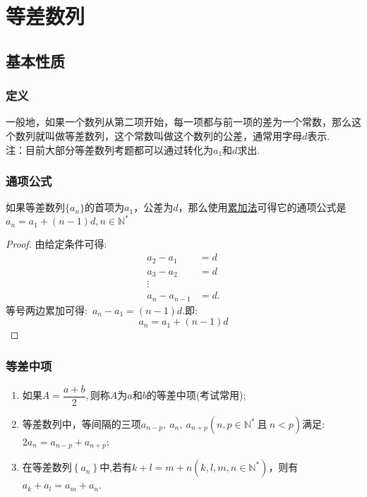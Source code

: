 \documentclass{BHCexam}
\begin{document}
\section{等差数列}
\subsection{基本性质} 
\subsubsection{定义}
一般地，如果一个数列从第二项开始，每一项都与前一项的差为一个常数，那么这个数列就叫做等差数列，这个常数叫做这个数列的公差，通常用字母$ d $表示.\\
{\kaishu 注：目前大部分等差数列考题都可以通过转化为$ a_1 $和$ d $求出.}
\subsubsection{通项公式}
如果等差数列$\{a_n\}$的首项为$ a_1 $，公差为$ d $，那么使用\underline{累加法}可得它的通项公式是$ a_n=a_1+(n-1)d ,n\in\mathbb{N^*}$
\begin{proof}
由给定条件可得:\begin{equation*}
\begin{aligned}
 a_2-a_1& =d\\
a_3-a_2&=d\\
\vdots&\\
a_n-a_{n-1}&=d.
\end{aligned}
\end{equation*}
等号两边累加可得:~$ a_n-a_1=(n-1)d .$即:~$$a_n=a_1+(n-1)d$$
\end{proof}
\subsubsection{等差中项}
\begin{enumerate}[1)]
\item 如果$ A=\dfrac{a+b}{2} ,$则称$ A $为$ a $和$ b $的等差中项(考试常用);
\item 等差数列中，等间隔的三项$a_{n-p},~a_n,~a_{n+p} (n,p\in\mathbb{N^*}~\text{且}~n<p) $满足:$ 2a_n=a_{n-p}+a_{n+p} $;
\item 在等差数列$ \left\{a_n\right\} $中,若有$ k+l=m+n \left(k,l,m,n\in\mathbb{N^*}\right)$，则有$ a_k+a_l=a_m+a_n $.
\end{enumerate}
\end{document}
